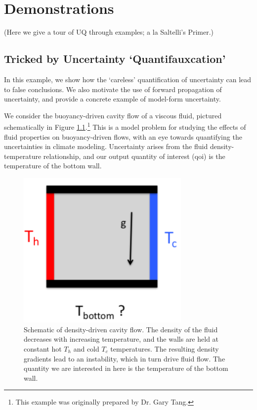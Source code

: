 \documentclass[../primer.tex]{subfiles}
\begin{document}
\chapter{Demonstrations}
(Here we give a tour of UQ through examples; a la Saltelli's Primer.)

\section{Tricked by Uncertainty `Quantifauxcation'}
In this example, we show how the `careless' quantification of uncertainty can
lead to false conclusions. We also motivate the use of forward propagation of
uncertainty, and provide a concrete example of model-form uncertainty.

We consider the buoyancy-driven cavity flow of a viscous fluid, pictured
schematically in Figure \ref{fig:cavity-schematic}.\footnote{This example was
  originally prepared by Dr. Gary Tang.} This is a model problem for studying
the effects of fluid properties on buoyancy-driven flows, with an eye towards
quantifying the uncertainties in climate modeling. Uncertainty arises from the
fluid density-temperature relationship, and our output quantity of interest
(qoi) is the temperature of the bottom wall.

\begin{figure}[!ht]
  \includegraphics[width=0.75\textwidth]{./images/cavity_schematic}
  \caption{Schematic of density-driven cavity flow. The density of the fluid
    decreases with increasing temperature, and the walls are held at constant
    hot $T_h$ and cold $T_c$ temperatures. The resulting density gradients lead
    to an instability, which in turn drive fluid flow. The quantity we are
    interested in here is the temperature of the bottom wall.}
  \label{fig:cavity-schematic}
\end{figure}
\end{document}
